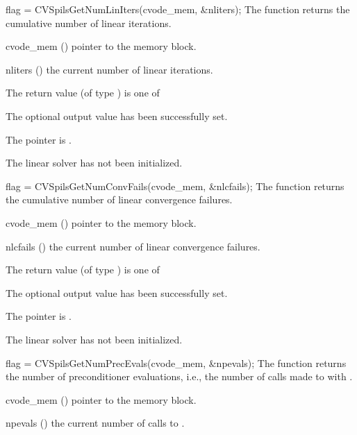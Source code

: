 {
  flag = CVSpilsGetNumLinIters(cvode\_mem, \&nliters);
}
{
  The function  returns the
  cumulative number of linear iterations.
}
{
  \begin{args}
  \item[cvode\_mem] ()
    pointer to the {\cvode} memory block.
  \item[nliters] ()
    the current number of linear iterations.
  \end{args}
}
{
  The return value  (of type ) is one of
  \begin{args}
  \item[\Id{CVSPILS\_SUCCESS}] 
    The optional output value has been successfully set.
  \item[\Id{CVSPILS\_MEM\_NULL}]
    The  pointer is .
  \item[\Id{CVSPILS\_LMEM\_NULL}]
    The {\cvspils} linear solver has not been initialized.
  \end{args}
}
{}
{
  flag = CVSpilsGetNumConvFails(cvode\_mem, \&nlcfails);
}
{
  The function  returns the
  cumulative number of linear convergence failures.
}
{
  \begin{args}
  \item[cvode\_mem] ()
    pointer to the {\cvode} memory block.
  \item[nlcfails] ()
    the current number of linear convergence failures.
  \end{args}
}
{
  The return value  (of type ) is one of
  \begin{args}
  \item[\Id{CVSPILS\_SUCCESS}] 
    The optional output value has been successfully set.
  \item[\Id{CVSPILS\_MEM\_NULL}]
    The  pointer is .
  \item[\Id{CVSPILS\_LMEM\_NULL}]
    The {\cvspils} linear solver has not been initialized.
  \end{args}
}
{}
{
  flag = CVSpilsGetNumPrecEvals(cvode\_mem, \&npevals);
}
{
  The function  returns the
  number of preconditioner evaluations, i.e., the number of 
  calls made to  with .
}
{
  \begin{args}
  \item[cvode\_mem] ()
    pointer to the {\cvode} memory block.
  \item[npevals] ()
    the current number of calls to .
  \end{args}
}
